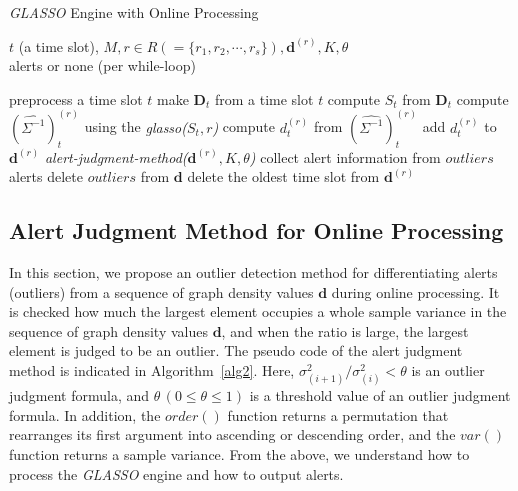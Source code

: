 \documentclass[conference]{IEEEtran}
\begin{document}
\begin{algorithm}[tb]
\caption{{\it GLASSO} Engine with Online Processing}
\label{alg1}
\begin{algorithmic}[1]
  \REQUIRE $t$ (a time slot), $M, r \in R ( = \{r_1, r_2, \cdots, r_s\} ), \bm{d}^{(r)}, K, \theta$\\
  \ENSURE alerts or none (per while-loop)

    \STATE preprocess a time slot $t$
    \STATE make $\bm{D}_t$ from a time slot $t$
    \STATE compute $S_t$ from $\bm{D}_t$
      \STATE compute ${(\hat{\Sigma^{-1}})}_t^{(r)}$ using the {\it glasso($S_t,r$)}
      \STATE compute $d_t^{(r)}$ from ${(\hat{\Sigma^{-1}})}_t^{(r)}$
      \STATE add $d_t^{(r)}$ to $\bm{d}^{(r)}$
         {\it alert-judgment-method($\bm{d}^{(r)}, K, \theta$)}
          \STATE collect alert information from $outliers$
          \RETURN alerts
          \STATE delete $outliers$ from $\bm{d}$
        \ELSE
          \STATE delete the oldest time slot from $\bm{d}^{(r)}$
        \ENDIF
  		\ENDIF
  	\ENDFOR
  \ENDWHILE
\end{algorithmic}
\end{algorithm}





\subsection{Alert Judgment Method for Online Processing}
In this section, we propose an outlier detection method for differentiating alerts (outliers) from a sequence of graph density values $\bm{d}$ during online processing.
It is checked how much the largest element occupies a whole sample variance in the sequence of graph density values $\bm{d}$, and when the ratio is large, the largest element is judged to be an outlier.
The pseudo code of the alert judgment method is indicated in Algorithm~\ref{alg2}.
Here, $\sigma^{2}_{(i+1)}/\sigma^{2}_{(i)}<\theta$ is an outlier judgment formula, and $\theta \, (0\leq \theta \leq 1)$ is a threshold value of an outlier judgment formula.
In addition, the $order()$ function returns a permutation that rearranges its first argument into ascending or descending order, and the $var()$ function returns a sample variance.
From the above, we understand how to process the {\it GLASSO} engine and how to output alerts.
\end{document}
